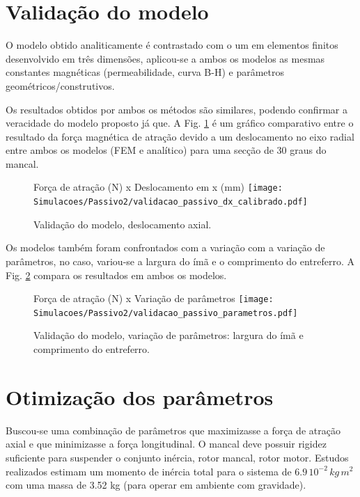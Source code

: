 \section{Validação do modelo}

O modelo obtido analiticamente é contrastado com o um em elementos finitos desenvolvido em três dimensões, aplicou-se a ambos os modelos as mesmas constantes magnéticas (permeabilidade, curva B-H) e parâmetros geométricos/construtivos.

Os resultados obtidos por ambos os métodos são similares, podendo confirmar a veracidade do modelo proposto já que. A Fig. \ref{fig:validacao_passivo_dx_calibrado} é um gráfico comparativo entre o resultado da força magnética de atração devido a um deslocamento no eixo radial entre ambos os modelos (FEM e analítico) para uma secção de 30 graus do mancal.

\begin{figure}[th!]
	\centering
	Força de atração (N) x Deslocamento em x (mm)
	\texttt{[image: Simulacoes/Passivo2/validacao\_passivo\_dx\_calibrado.pdf]}
	\caption{Validação do modelo, deslocamento axial.}
	\label{fig:validacao_passivo_dx_calibrado}
\end{figure}

Os modelos também foram confrontados com a variação com a variação de parâmetros, no caso, variou-se a largura do ímã e o comprimento do entreferro. A Fig. \ref{fig:validacao_passivo_parametros} compara os resultados em ambos os modelos.

\begin{figure}[th!]
	\centering
	Força de atração (N) x Variação de parâmetros
	\texttt{[image: Simulacoes/Passivo2/validacao\_passivo\_parametros.pdf]}
	\caption{Validação do modelo, variação de parâmetros: largura do ímã e comprimento do entreferro.}
	\label{fig:validacao_passivo_parametros}
\end{figure} 


\section{Otimização dos parâmetros}

Buscou-se uma combinação de parâmetros que maximizasse a força de atração axial e que minimizasse a força longitudinal. O mancal deve possuir rigidez suficiente para suspender o conjunto inércia, rotor mancal, rotor motor. Estudos realizados estimam um momento de inércia total para o sistema de $6.9 \, 10^{-2} \, kg \, m^2$ com uma massa de 3.52 kg (para operar em ambiente com gravidade). 

